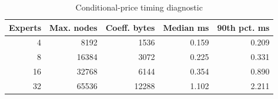 \begin{table}[htbp]\caption{Conditional-price timing diagnostic}\begin{tabular}{rrrrr}\toprule
Experts & Max. nodes & Coeff. bytes & Median ms & 90th pct. ms\\\midrule
4 & 8192 & 1536 & 0.159 & 0.209\\
8 & 16384 & 3072 & 0.225 & 0.331\\
16 & 32768 & 6144 & 0.354 & 0.890\\
32 & 65536 & 12288 & 1.102 & 2.211\\
\bottomrule\end{tabular}\end{table}
